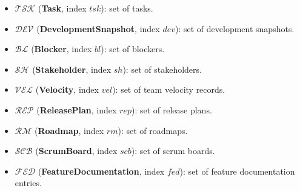 \documentclass[11pt,a4paper]{article}
\begin{document}
\begin{itemize}[leftmargin=2em]
  \item $\mathcal{TSK}$ (\textbf{Task}, index $tsk$): set of tasks.
  \item $\mathcal{DEV}$ (\textbf{DevelopmentSnapshot}, index $dev$): set of development snapshots.
  \item $\mathcal{BL}$ (\textbf{Blocker}, index $bl$): set of blockers.
  \item $\mathcal{SH}$ (\textbf{Stakeholder}, index $sh$): set of stakeholders.
  \item $\mathcal{VEL}$ (\textbf{Velocity}, index $vel$): set of team velocity records.
  \item $\mathcal{REP}$ (\textbf{ReleasePlan}, index $rep$): set of release plans.
  \item $\mathcal{RM}$ (\textbf{Roadmap}, index $rm$): set of roadmaps.
  \item $\mathcal{SCB}$ (\textbf{ScrumBoard}, index $scb$): set of scrum boards.
  \item $\mathcal{FED}$ (\textbf{FeatureDocumentation}, index $fed$): set of feature documentation entries.
\end{itemize}
\end{document}
